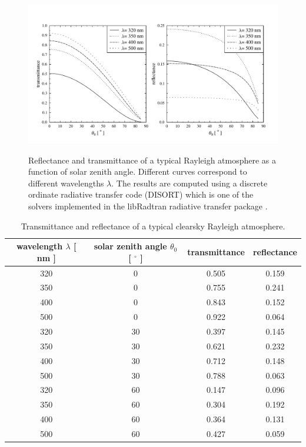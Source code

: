 \documentclass[12pt,twoside,a4paper]{article}
\begin{document}
\begin{figure}[htbp]
  \centering
  \includegraphics[width=1.\hsize]{./figs/rayleigh.pdf}\\
  \caption{Reflectance and transmittance of a typical Rayleigh
    atmosphere as a function of solar zenith
    angle. Different curves correspond to different wavelengths
    $\lambda$. The results are computed using a
    discrete ordinate radiative transfer code (DISORT) which is one of
    the solvers implemented in the libRadtran radiative transfer
    package \citep{mayer2005}.}
    \label{fig:rayleigh_result}

\end{figure}
\begin{table}
  \centering
  \begin{tabular}{c c c c}
    \hline
    wavelength $\lambda$ [ nm ]  & solar zenith angle $\theta_0$ [ $^\circ$ ] & transmittance &
    reflectance \\ \hline
    320 & 0  & 0.505 & 0.159 \\
    350 &  0 & 0.755 & 0.241 \\
    400 &  0 & 0.843 & 0.152 \\ 
    500 &  0 & 0.922 & 0.064 \\
    320 & 30 & 0.397 & 0.145 \\
    350 & 30 & 0.621 & 0.232 \\
    400 & 30 & 0.712 & 0.148 \\
    500 & 30 & 0.788 & 0.063 \\
    320 & 60 & 0.147 & 0.096 \\
    350 & 60 & 0.304 & 0.192 \\
    400 & 60 & 0.364 & 0.131 \\
    500 & 60 & 0.427 & 0.059 \\ \hline
  \end{tabular}
  \caption{Transmittance and reflectance of a typical clearsky
    Rayleigh atmosphere.}
  \label{tab:rayleigh_result}
\end{table}
\end{document}
